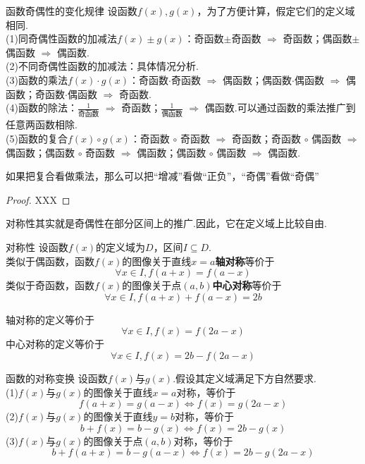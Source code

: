 \documentclass[lang=cn, zihao=5]{elegantbook}
\begin{document}
\begin{proposition}{函数奇偶性的变化规律}
    设函数$f(x),g(x)$，为了方便计算，假定它们的定义域相同.\\
    (1)同奇偶性函数的加减法$f(x) \pm g(x)$：奇函数$\pm$奇函数 $\Rightarrow$ 奇函数；偶函数$\pm$偶函数 $\Rightarrow$ 偶函数.\\
    (2)不同奇偶性函数的加减法：具体情况分析.\\
    (3)函数的乘法$f(x) \cdot g(x)$：奇函数$\cdot$奇函数 $\Rightarrow$ 偶函数；偶函数$\cdot$偶函数 $\Rightarrow$ 偶函数；奇函数$\cdot$偶函数 $\Rightarrow$ 奇函数.\\
    (4)函数的除法：$\frac{1}{\text{奇函数}}$ $\Rightarrow$ 奇函数；$\frac{1}{\text{偶函数}}$ $\Rightarrow$ 偶函数.可以通过函数的乘法推广到任意两函数相除.\\
    (5)函数的复合$f(x) \circ g(x)$：奇函数 $\circ$ 奇函数 $\Rightarrow$ 奇函数；奇函数 $\circ$ 偶函数 $\Rightarrow$ 偶函数；偶函数 $\circ$ 奇函数 $\Rightarrow$ 偶函数；偶函数 $\circ$ 偶函数 $\Rightarrow$ 偶函数.
\end{proposition}
\begin{remark}
	如果把复合看做乘法，那么可以把“增减”看做“正负”，“奇偶”看做“奇偶”
\end{remark}
\begin{proof}
    XXX
\end{proof}

对称性其实就是奇偶性在部分区间上的推广.因此，它在定义域上比较自由.

\begin{definition}{对称性} %
    设函数$f(x)$的定义域为$D$，区间$I \subseteq D$.\\
    类似于偶函数，函数$f(x)$的图像关于直线$x=a$\textbf{轴对称}等价于
    $$ \forall x \in I, f(a+x)=f(a-x) $$
    类似于奇函数，函数$f(x)$的图像关于点$(a,b)$\textbf{中心对称}等价于
    $$ \forall x \in I, f(a+x)+f(a-x)=2b $$
\end{definition}
\begin{remark}
    轴对称的定义等价于$$\forall x \in I, f(x)=f(2a-x)$$
    中心对称的定义等价于$$\forall x \in I, f(x)=2b-f(2a-x)$$
\end{remark}

\begin{proposition}{函数的对称变换}
    设函数$f(x)$与$g(x)$.假设其定义域满足下方自然要求.\\
    (1)$f(x)$与$g(x)$的图像关于直线$x=a$对称，等价于$$f(a+x)=g(a-x) \Longleftrightarrow f(x)=g(2a-x)$$
    (2)$f(x)$与$g(x)$的图像关于直线$y=b$对称，等价于$$b+f(x)=b-g(x) \Longleftrightarrow f(x)=2b-g(x)$$
    (3)$f(x)$与$g(x)$的图像关于点$(a,b)$对称，等价于$$b+f(a+x)=b-g(a-x) \Longleftrightarrow f(x)=2b-g(2a-x)$$
\end{proposition}
\end{document}

